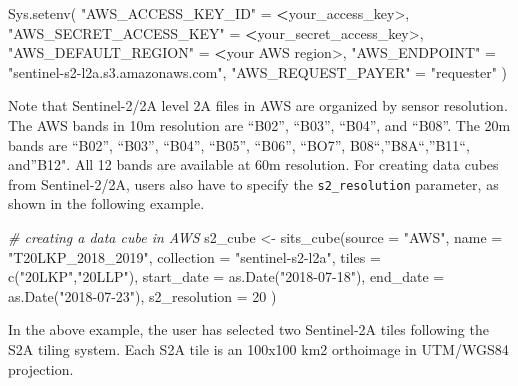 \documentclass[a4paper,]{tufte-book}
\newenvironment{Shaded}{}{}
\newcommand{\AttributeTok}[1]{\textcolor[rgb]{0.49,0.56,0.16}{#1}}
\newcommand{\CommentTok}[1]{\textcolor[rgb]{0.38,0.63,0.69}{\textit{#1}}}
\newcommand{\DecValTok}[1]{\textcolor[rgb]{0.25,0.63,0.44}{#1}}
\newcommand{\ErrorTok}[1]{\textcolor[rgb]{1.00,0.00,0.00}{\textbf{#1}}}
\newcommand{\FunctionTok}[1]{\textcolor[rgb]{0.02,0.16,0.49}{#1}}
\newcommand{\NormalTok}[1]{#1}
\newcommand{\OtherTok}[1]{\textcolor[rgb]{0.00,0.44,0.13}{#1}}
\newcommand{\SpecialCharTok}[1]{\textcolor[rgb]{0.25,0.44,0.63}{#1}}
\newcommand{\StringTok}[1]{\textcolor[rgb]{0.25,0.44,0.63}{#1}}
\begin{document}
\begin{Shaded}
\begin{Highlighting}[]
\FunctionTok{Sys.setenv}\NormalTok{(}
    \StringTok{"AWS\_ACCESS\_KEY\_ID"}     \OtherTok{=} \ErrorTok{\textless{}}\NormalTok{your\_access\_key}\SpecialCharTok{\textgreater{}}\NormalTok{,}
    \StringTok{"AWS\_SECRET\_ACCESS\_KEY"} \OtherTok{=} \ErrorTok{\textless{}}\NormalTok{your\_secret\_access\_key}\SpecialCharTok{\textgreater{}}\NormalTok{,}
    \StringTok{"AWS\_DEFAULT\_REGION"}    \OtherTok{=} \ErrorTok{\textless{}}\NormalTok{your AWS region}\SpecialCharTok{\textgreater{}}\NormalTok{,}
    \StringTok{"AWS\_ENDPOINT"} \OtherTok{=} \StringTok{"sentinel{-}s2{-}l2a.s3.amazonaws.com"}\NormalTok{,}
    \StringTok{"AWS\_REQUEST\_PAYER"}     \OtherTok{=} \StringTok{"requester"}
\NormalTok{)}
\end{Highlighting}
\end{Shaded}

Note that Sentinel-2/2A level 2A files in AWS are organized by sensor resolution.
The AWS bands in 10m resolution are ``B02'', ``B03'', ``B04'', and ``B08''.
The 20m bands are ``B02'', ``B03'', ``B04'', ``B05'', ``B06'', ``BO7'', B08``,''B8A``,''B11``, and''B12".
All 12 bands are available at 60m resolution.
For creating data cubes from Sentinel-2/2A, users also have to specify
the \texttt{s2\_resolution} parameter, as shown in the following example.

\begin{Shaded}
\begin{Highlighting}[]
\CommentTok{\# creating a data cube in AWS}
\NormalTok{s2\_cube }\OtherTok{\textless{}{-}} \FunctionTok{sits\_cube}\NormalTok{(}\AttributeTok{source =} \StringTok{"AWS"}\NormalTok{,}
                     \AttributeTok{name =} \StringTok{"T20LKP\_2018\_2019"}\NormalTok{,}
                     \AttributeTok{collection =} \StringTok{"sentinel{-}s2{-}l2a"}\NormalTok{,}
                     \AttributeTok{tiles =} \FunctionTok{c}\NormalTok{(}\StringTok{"20LKP"}\NormalTok{,}\StringTok{"20LLP"}\NormalTok{),}
                     \AttributeTok{start\_date =} \FunctionTok{as.Date}\NormalTok{(}\StringTok{"2018{-}07{-}18"}\NormalTok{),}
                     \AttributeTok{end\_date =} \FunctionTok{as.Date}\NormalTok{(}\StringTok{"2018{-}07{-}23"}\NormalTok{),}
                     \AttributeTok{s2\_resolution =} \DecValTok{20}
\NormalTok{)}
\end{Highlighting}
\end{Shaded}

In the above example, the user has selected two Sentinel-2A tiles following the
S2A tiling system. Each S2A tile is an 100x100 km2 orthoimage in UTM/WGS84 projection.
\end{document}
